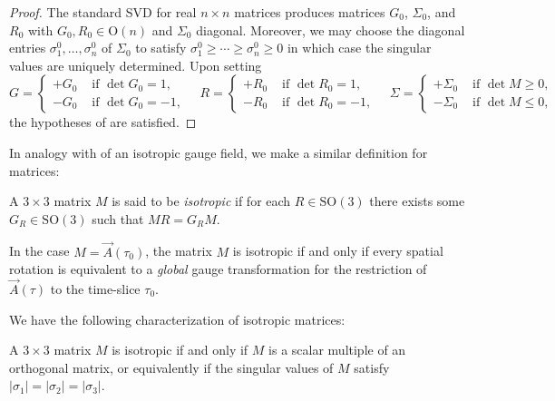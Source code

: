 \begin{proof}
The standard SVD for real $n\times n$ matrices produces matrices $G_{0}$, $\Sigma_{0}$, and $R_{0}$ with $G_{0},R_{0}\in\mathrm{O}(n)$ and $\Sigma_{0}$ diagonal. Moreover, we may choose the diagonal entries $\sigma_{1}^{0},\ldots,\sigma_{n}^{0}$ of $\Sigma_{0}$ to satisfy $\sigma_{1}^{0}\geq\cdots\geq\sigma_{n}^{0}\geq0$ in which case the singular values are uniquely determined. Upon setting 
\[
G=\begin{cases}
+G_{0} & \textrm{ if }\det G_{0}=1,\\
-G_{0} & \textrm{ if }\det G_{0}=-1,
\end{cases}\quad R=\begin{cases}
+R_{0} & \textrm{ if }\det R_{0}=1,\\
-R_{0} & \textrm{ if }\det R_{0}=-1,
\end{cases}\quad\Sigma=\begin{cases}
+\Sigma_{0} & \textrm{ if }\det M\geq0,\\
-\Sigma_{0} & \textrm{ if }\det M\leq0,
\end{cases}
\]
 the hypotheses of  are satisfied. 
\end{proof}
In analogy with  of an isotropic gauge field, we make a similar definition for matrices:
\begin{defn}
\label{def:isotropic-matrix}A $3\times3$ matrix $M$ is said to be \emph{isotropic} if for each $R\in\mathrm{SO}(3)$ there exists some $G_{R}\in\mathrm{SO}(3)$ such that $MR=G_{R}M$.
\end{defn}

In the case $M=\vec{A}(\tau_{0})$, the matrix $M$ is isotropic if and only if every spatial rotation is equivalent to a \emph{global} gauge transformation for the restriction of $\vec{A}(\tau)$ to the time-slice $\tau_{0}$. 

We have the following characterization of isotropic matrices:
\begin{lem}
\label{lem:matrix-isotropy}A $3\times3$ matrix $M$ is isotropic if and only if $M$ is a scalar multiple of an orthogonal matrix, or equivalently if the singular values of $M$ satisfy $\left|\sigma_{1}\right|=\left|\sigma_{2}\right|=\left|\sigma_{3}\right|$. 
\end{lem}

